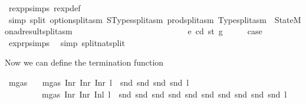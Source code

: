 \begin{isabellebody}
\ rexp{\isachardot}{\kern0pt}psimps\ rexp{\isacharunderscore}{\kern0pt}def\ \isamarkupfalse%
\ {\isacharparenleft}{\kern0pt}simp\ split{\isacharcolon}{\kern0pt}\ option{\isachardot}{\kern0pt}split{\isacharunderscore}{\kern0pt}asm\ STypes{\isachardot}{\kern0pt}split{\isacharunderscore}{\kern0pt}asm\ prod{\isachardot}{\kern0pt}split{\isacharunderscore}{\kern0pt}asm\ Type{\isachardot}{\kern0pt}split{\isacharunderscore}{\kern0pt}asm\ \ StateMonad{\isachardot}{\kern0pt}result{\isachardot}{\kern0pt}split{\isacharunderscore}{\kern0pt}asm{\isacharparenright}{\kern0pt}\isanewline
\ \ \ \ \ \ \ \ \isamarkupfalse%
\isanewline
\ \ \ \ \ \ \isamarkupfalse%
\isanewline
\ \ \ \ \isamarkupfalse%
\isanewline
\ \ \isamarkupfalse%
\isanewline
{}\isamarkupfalse%
\isanewline
\ \ \isamarkupfalse%
\ {\isacharparenleft}{\kern0pt}{}{}\ e\ cd\ st\ g{\isacharparenright}{\kern0pt}\isanewline
\ \ \isamarkupfalse%
\ \isamarkupfalse%
\ {\isacharquery}{\kern0pt}case\ \isamarkupfalse%
\ expr{\isachardot}{\kern0pt}psimps{\isacharparenleft}{\kern0pt}{}{}{\isacharparenright}{\kern0pt}\ \isamarkupfalse%
\ {\isacharparenleft}{\kern0pt}simp\ split{\isacharcolon}{\kern0pt}nat{\isachardot}{\kern0pt}split{\isacharparenright}{\kern0pt}\isanewline
{}\isamarkupfalse%
%
\endisatagproof
{\isafoldproof}%
%
\isadelimproof
%
\endisadelimproof
%
\begin{isamarkuptext}%
Now we can define the termination function%
\end{isamarkuptext}\isamarkuptrue%
\isamarkupfalse%
\ mgas\isanewline
\ \ \ {\isachardoublequoteopen}mgas\ {\isacharparenleft}{\kern0pt}Inr\ {\isacharparenleft}{\kern0pt}Inr\ {\isacharparenleft}{\kern0pt}Inr\ l{\isacharparenright}{\kern0pt}{\isacharparenright}{\kern0pt}{\isacharparenright}{\kern0pt}\ {\isacharequal}{\kern0pt}\ snd\ {\isacharparenleft}{\kern0pt}snd\ {\isacharparenleft}{\kern0pt}snd\ {\isacharparenleft}{\kern0pt}snd\ l{\isacharparenright}{\kern0pt}{\isacharparenright}{\kern0pt}{\isacharparenright}{\kern0pt}{\isachardoublequoteclose}\ \isanewline
\ \ \ \ \ \ \ \ {\isacharbar}{\kern0pt}\ {\isachardoublequoteopen}mgas\ {\isacharparenleft}{\kern0pt}Inr\ {\isacharparenleft}{\kern0pt}Inr\ {\isacharparenleft}{\kern0pt}Inl\ l{\isacharparenright}{\kern0pt}{\isacharparenright}{\kern0pt}{\isacharparenright}{\kern0pt}\ {\isacharequal}{\kern0pt}\ snd\ {\isacharparenleft}{\kern0pt}snd\ {\isacharparenleft}{\kern0pt}snd\ {\isacharparenleft}{\kern0pt}snd\ {\isacharparenleft}{\kern0pt}snd\ {\isacharparenleft}{\kern0pt}snd\ {\isacharparenleft}{\kern0pt}snd\ {\isacharparenleft}{\kern0pt}snd\ {\isacharparenleft}{\kern0pt}snd\ {\isacharparenleft}{\kern0pt}snd\ l{\isacharparenright}{\kern0pt}{\isacharparenright}{\kern0pt}{\isacharparenright}{\kern0pt}{\isacharparenright}{\kern0pt}{\isacharparenright}{\kern0pt}{\isacharparenright}{\kern0pt}{\isacharparenright}{\kern0pt}{\isacharparenright}{\kern0pt}{\isacharparenright}{\kern0pt}{\isachardoublequoteclose}\ \isanewline

\end{isabellebody}
